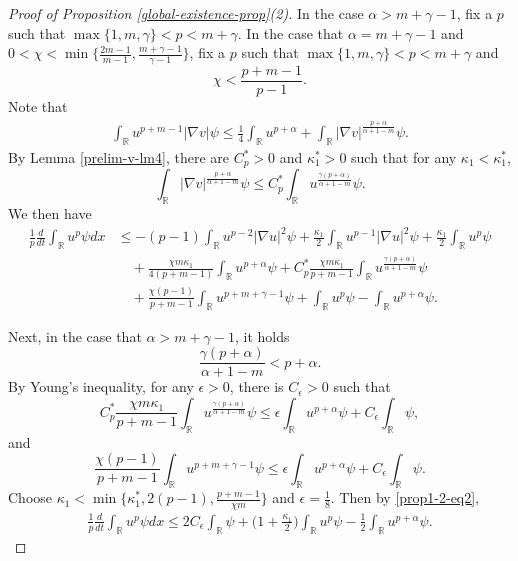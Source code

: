 \documentclass[11pt]{article} %
\theoremstyle{remark}
\theoremstyle{remark}
\numberwithin{equation}{section}
\numberwithin{figure}{section}
\numberwithin{table}{section}
\newcommand\RR{\ensuremath{\mathbb{R}}}
\begin{document}
\begin{proof} [Proof of Proposition \ref{global-existence-prop}(2)]
In the case   $\alpha>m+\gamma -1$, fix a  $p$ such that $\max\{1,m,\gamma\}<p<m+\gamma$. In the case
that $\alpha=m+\gamma-1$ and   $0<\chi<\min\{ \frac{2m-1}{m-1}, \frac{m+\gamma -1}{\gamma-1}\}$, fix a $p$ such that  $\max\{1,m,\gamma\}<p<m+\gamma$ and 
$$
\chi<\frac{p+m-1}{p-1}.
$$
Note that
\begin{align*}
\int_{\RR} u^{p+m-1}|\nabla v|\psi \le \frac{1}{4}\int_{\RR} u^{p+\alpha} +\int_{\RR} |\nabla v|^{\frac{p+\alpha}{\alpha+1-m}}\psi.
\end{align*}
By  Lemma \ref{prelim-v-lm4},  there are $C^*_p>0$ and  $\kappa_1^*>0$ such that for any $\kappa_1<\kappa_1^*$, 
$$
\int_{\RR} |\nabla v|^{\frac{p+\alpha}{\alpha+1-m}}\psi\le C^*_p \int_{\RR} u^{\frac{\gamma (p+\alpha)}{\alpha+1-m}}\psi.
$$
We then have
\begin{align}
\label{prop1-2-eq2}
\frac{1}{p}\frac{d}{dt}\int_{\RR} u^p \psi dx&\le -(p -1)\int_{\RR} u^{p-2}|\nabla u|^2\psi
+\frac{\kappa_1}{2}\int_{\RR} u^{p-1} |\nabla u|^2 \psi +\frac{\kappa_1}{2}\int_{\RR} u^p \psi\nonumber\\
&\quad + \frac{\chi m \kappa_1}{4(p+m-1)}\int_{\RR} u^{p+\alpha}\psi+C^*_p \frac{\chi m \kappa_1}{p+m-1} \int_{\RR} u^{\frac{\gamma (p+\alpha)}{\alpha+1-m}}\psi\nonumber\\
&\quad +\frac{\chi(p - 1)}{p+m-1}\int_{\RR} u^{p+m+\gamma-1}\psi+\int_{\RR}u^p \psi-\int_{\RR} u^{p+\alpha}\psi.
    \end{align}


Next, 
in the case that $\alpha>m+\gamma -1$, it holds 
$$
\frac{\gamma(p+\alpha)}{\alpha+1-m}< p+\alpha.
$$ 
By Young's inequality, for any $\epsilon>0$, there is $C_\epsilon>0$ such that
$$
C^*_p \frac{\chi m \kappa_1}{p+m-1} \int_{\RR} u^{\frac{\gamma (p+\alpha)}{\alpha+1-m}}\psi\le \epsilon \int_{\RR} u^{p+\alpha}\psi +C_\epsilon \int_{\RR}\psi,
$$
and
$$
\frac{\chi(p - 1)}{p+m-1}\int_{\RR} u^{p+m+\gamma-1}\psi\le \epsilon \int_{\RR} u^{p+\alpha}\psi +C_\epsilon\int_{\RR}\psi.
$$
Choose  $\kappa_1<\min\{\kappa_1^*, 2(p-1), \frac{p+m-1}{\chi m}\}$ and $\epsilon=\frac{1}{8}$. Then by \eqref{prop1-2-eq2},
\begin{align}
\label{prop1-2-eq2-1}
\frac{1}{p}\frac{d}{dt}\int_\RR u^p \psi dx\le 2C_\epsilon \int_{\RR} \psi+\big(1+\frac{\kappa_1}{2}\big)\int_{\RR}u^p\psi -\frac{1}{2}\int_{\RR} u^{p+\alpha}\psi.
\end{align}



\end{proof}
\end{document}
